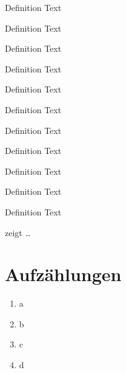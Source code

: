 \begin{definition}[Title]
\label{def:def1}
Definition Text
\end{definition}

\begin{definition}[Title]
\label{def:def1}
Definition Text
\end{definition}

\begin{definition}[Title]
\label{def:def1}
Definition Text
\end{definition}

\begin{definition}[Title]
\label{def:def1}
Definition Text
\end{definition}

\begin{definition}[Title]
\label{def:def1}
Definition Text
\end{definition}

\begin{definition}[Title]
\label{def:def1}
Definition Text
\end{definition}

\begin{definition}[Title]
\label{def:def1}
Definition Text
\end{definition}

\begin{definition}[Title]
\label{def:def1}
Definition Text
\end{definition}

\begin{definition}[Title]
\label{def:def1}
Definition Text
\end{definition}

\begin{definition}[Title]
\label{def:def1}
Definition Text
\end{definition}

\begin{definition}[Title]
\label{def:def1}
Definition Text
\end{definition}

 zeigt \ldots


\section{Aufzählungen}
\begin{enumerate}[label=\alph*)]
\item a
\item b
\item c
\item d
\end{enumerate}

